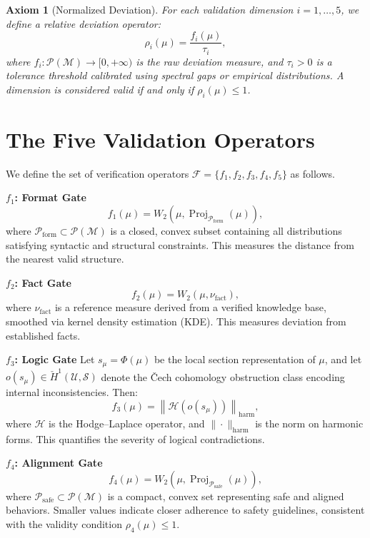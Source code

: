 \documentclass[11pt,a4paper]{article}
\theoremstyle{plain}
\newtheorem{axiom}{Axiom}[section]
\begin{document}
	\begin{axiom}[Normalized Deviation]
		For each validation dimension $i = 1, \dots, 5$, we define a relative deviation operator:
		\[
		\rho_i(\mu) = \frac{f_i(\mu)}{\tau_i},
		\]
		where $f_i: \mathcal{P}(\mathcal{M}) \to [0, +\infty)$ is the raw deviation measure, and $\tau_i > 0$ is a tolerance threshold calibrated using spectral gaps or empirical distributions. A dimension is considered valid if and only if $\rho_i(\mu) \le 1$.
	\end{axiom}
	
	\section{The Five Validation Operators}
	
	We define the set of verification operators $\mathcal{F} = \{f_1, f_2, f_3, f_4, f_5\}$ as follows.
	
	\noindent\textbf{$f_1$: Format Gate}
	\[
	f_1(\mu) = W_2\left(\mu, \operatorname{Proj}_{\mathcal{P}_{\text{form}}}(\mu)\right),
	\]
	where $\mathcal{P}_{\text{form}} \subset \mathcal{P}(\mathcal{M})$ is a closed, convex subset containing all distributions satisfying syntactic and structural constraints. This measures the distance from the nearest valid structure.
	
	\vspace{0.5em}
	\noindent\textbf{$f_2$: Fact Gate}
	\[
	f_2(\mu) = W_2\left(\mu, \nu_{\text{fact}}\right),
	\]
	where $\nu_{\text{fact}}$ is a reference measure derived from a verified knowledge base, smoothed via kernel density estimation (KDE). This measures deviation from established facts.
	
	\vspace{0.5em}
	\noindent\textbf{$f_3$: Logic Gate}
	Let $s_\mu = \Phi(\mu)$ be the local section representation of $\mu$, and let $o(s_\mu) \in \check{H}^1(\mathcal{U}, \mathcal{S})$ denote the Čech cohomology obstruction class encoding internal inconsistencies. Then:
	\[
	f_3(\mu) = \left\| \mathcal{H}\left(o(s_\mu)\right) \right\|_{\text{harm}},
	\]
	where $\mathcal{H}$ is the Hodge–Laplace operator, and $\|\cdot\|_{\text{harm}}$ is the norm on harmonic forms. This quantifies the severity of logical contradictions.
	
	\vspace{0.5em}
	\noindent\textbf{$f_4$: Alignment Gate}
	\[
	f_4(\mu) = W_2\left(\mu, \operatorname{Proj}_{\mathcal{P}_{\text{safe}}}(\mu)\right),
	\]
	where $\mathcal{P}_{\text{safe}} \subset \mathcal{P}(\mathcal{M})$ is a compact, convex set representing safe and aligned behaviors. Smaller values indicate closer adherence to safety guidelines, consistent with the validity condition $\rho_4(\mu) \le 1$.
	
\end{document}
